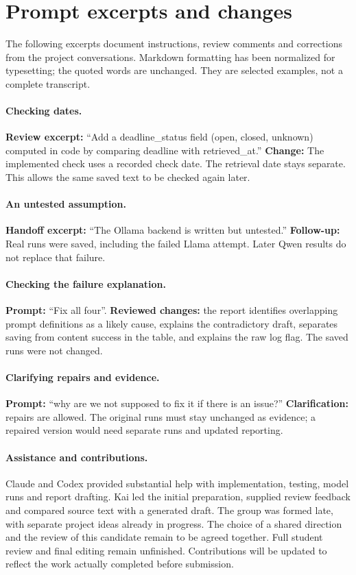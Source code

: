 \documentclass{article}
\begin{document}
\appendix
\section{Prompt excerpts and changes}
The following excerpts document instructions, review comments and corrections from
the project conversations. Markdown formatting has been normalized for typesetting;
the quoted words are unchanged. They are selected examples, not a complete transcript.

\paragraph{Checking dates.}
\textbf{Review excerpt:} ``Add a deadline\_status field (open,
closed, unknown) computed in code by comparing deadline with retrieved\_at.''
\textbf{Change:} The implemented check uses a recorded check date. The retrieval date stays
separate. This allows the same saved text to be checked again later.

\paragraph{An untested assumption.}
\textbf{Handoff excerpt:} ``The Ollama backend is written but untested.''
\textbf{Follow-up:} Real runs were saved, including the failed Llama attempt. Later Qwen
results do not replace that failure.

\paragraph{Checking the failure explanation.}
\textbf{Prompt:} ``Fix all four''.
\textbf{Reviewed changes:} the report identifies overlapping prompt definitions as
a likely cause, explains the contradictory draft, separates saving from content
success in the table, and explains the raw log flag. The saved runs were not changed.

\paragraph{Clarifying repairs and evidence.}
\textbf{Prompt:} ``why are we not supposed to fix it if there is an issue?''
\textbf{Clarification:} repairs are allowed. The original runs must stay unchanged
as evidence; a repaired version would need separate runs and updated reporting.

\paragraph{Assistance and contributions.}
Claude and Codex provided substantial help with implementation, testing, model runs
and report drafting. Kai led the initial preparation, supplied review feedback and
compared source text with a generated draft. The group was formed late, with
separate project ideas already in progress. The choice of a shared direction
and the review of this candidate remain to be agreed together.
Full student review and final editing remain unfinished. Contributions will be
updated to reflect the work actually completed before submission.
\end{document}
